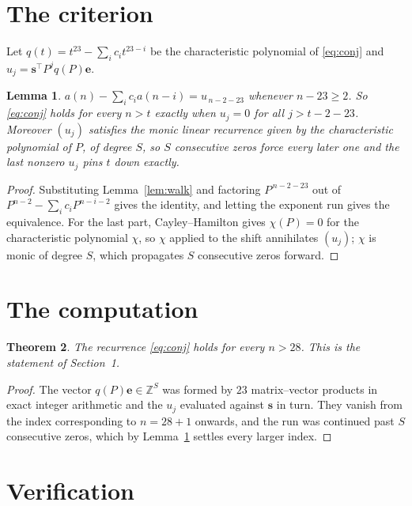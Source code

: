\documentclass[11pt,a4paper]{article}
\theoremstyle{plain}
\newtheorem{theorem}{Theorem}
\newtheorem{lemma}[theorem]{Lemma}
\theoremstyle{definition}
\begin{document}
\section{The criterion}

Let $q(t)=t^{23}-\sum_i c_i t^{23-i}$ be the characteristic polynomial of
\eqref{eq:conj} and $u_j=\mathbf{s}^{\!\top}P^{j}q(P)\mathbf{e}$.

\begin{lemma}\label{lem:crit}
$a(n)-\sum_i c_i a(n-i)=u_{\,n-2-23}$ whenever $n-23\ge2$. So \eqref{eq:conj}
holds for every $n>t$ exactly when $u_j=0$ for all $j>t-2-23$. Moreover $(u_j)$
satisfies the monic linear recurrence given by the characteristic polynomial of $P$, of
degree $S$, so $S$ consecutive zeros force every later one and the last nonzero $u_j$ pins
$t$ down exactly.
\end{lemma}

\begin{proof}
Substituting Lemma~\ref{lem:walk} and factoring $P^{\,n-2-23}$ out of
$P^{n-2}-\sum_i c_i P^{n-i-2}$ gives the identity, and letting the exponent run gives the
equivalence. For the last part, Cayley--Hamilton gives $\chi(P)=0$ for the characteristic
polynomial $\chi$, so $\chi$ applied to the shift annihilates $(u_j)$; $\chi$ is monic of
degree $S$, which propagates $S$ consecutive zeros forward.
\end{proof}

\section{The computation}

\begin{theorem}
The recurrence \eqref{eq:conj} holds for every $n>28$. This is the statement of
Section~1.
\end{theorem}

\begin{proof}
The vector $q(P)\mathbf{e}\in\mathbb{Z}^{S}$ was formed by $23$ matrix--vector
products in exact integer arithmetic and the $u_j$ evaluated against $\mathbf{s}$ in turn.
They vanish from the index corresponding to $n=28+1$ onwards, and the run was continued
past $S$ consecutive zeros, which by Lemma~\ref{lem:crit} settles every larger index.
\end{proof}

\section{Verification}
\end{document}
